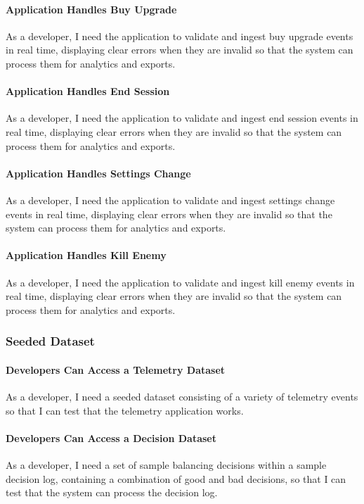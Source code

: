\paragraph{Application Handles Buy Upgrade}
As a developer, I need the application to validate and ingest buy upgrade events in real time, displaying clear errors when they are invalid so that the system can process them for analytics and exports.

\paragraph{Application Handles End Session}
As a developer, I need the application to validate and ingest end session events in real time, displaying clear errors when they are invalid so that the system can process them for analytics and exports.

\paragraph{Application Handles Settings Change}
As a developer, I need the application to validate and ingest settings change events in real time, displaying clear errors when they are invalid so that the system can process them for analytics and exports.

\paragraph{Application Handles Kill Enemy}
As a developer, I need the application to validate and ingest kill enemy events in real time, displaying clear errors when they are invalid so that the system can process them for analytics and exports.

\subsubsection{Seeded Dataset}

\paragraph{Developers Can Access a Telemetry Dataset}
As a developer, I need a seeded dataset consisting of a variety of telemetry events so that I can test that the telemetry application works.

\paragraph{Developers Can Access a Decision Dataset}
As a developer, I need a set of sample balancing decisions within a sample decision log, containing a combination of good and bad decisions, so that I can test that the system can process the decision log.

